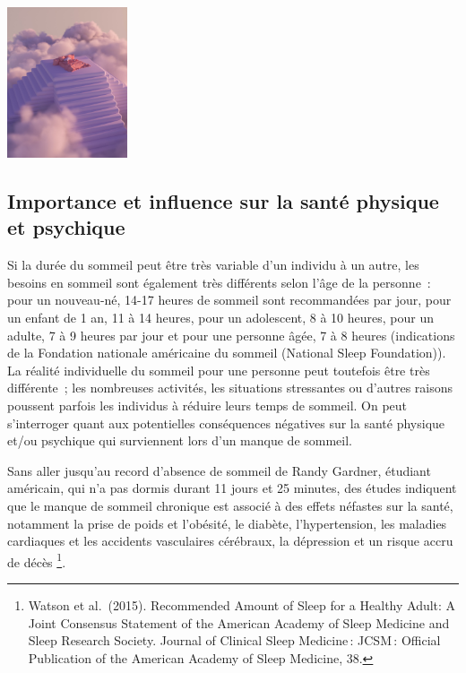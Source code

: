 \documentclass[
  10pt,
  french,
  a5paper,
  openany]{book}
\begin{document}
\begin{center}
\includegraphics[width=\textwidth,height=12em]{images/sommeil.jpg}

\end{center}

\hypertarget{importance-et-influence-sur-la-santuxe9-physique-et-psychique}{%
\subsection*{Importance et influence sur la santé physique et psychique}\label{importance-et-influence-sur-la-santuxe9-physique-et-psychique}}

Si la durée du sommeil peut être très variable d'un individu à un autre, les besoins en sommeil sont également très différents selon l'âge de la personne~: pour un nouveau-né, 14-17 heures de sommeil sont recommandées par jour, pour un enfant de 1 an, 11 à 14 heures, pour un adolescent, 8 à 10 heures, pour un adulte, 7 à 9 heures par jour et pour une personne âgée, 7 à 8 heures (indications de la Fondation nationale américaine du sommeil (National Sleep Foundation)). La réalité individuelle du sommeil pour une personne peut toutefois être très différente~; les nombreuses activités, les situations stressantes ou d'autres raisons poussent parfois les individus à réduire leurs temps de sommeil. On peut s'interroger quant aux potentielles conséquences négatives sur la santé physique et/ou psychique qui surviennent lors d'un manque de sommeil.

Sans aller jusqu'au record d'absence de sommeil de Randy Gardner, étudiant américain, qui n'a pas dormis durant 11 jours et 25 minutes, des études indiquent que le manque de sommeil chronique est associé à des effets néfastes sur la santé, notamment la prise de poids et l'obésité, le diabète, l'hypertension, les maladies cardiaques et les accidents vasculaires cérébraux, la dépression et un risque accru de décès \footnote{Watson et al.~(2015). Recommended Amount of Sleep for a Healthy Adult: A Joint Consensus Statement of the American Academy of Sleep Medicine and Sleep Research Society. Journal of Clinical Sleep Medicine\,: JCSM\,: Official Publication of the American Academy of Sleep Medicine, 38.}.
\end{document}
